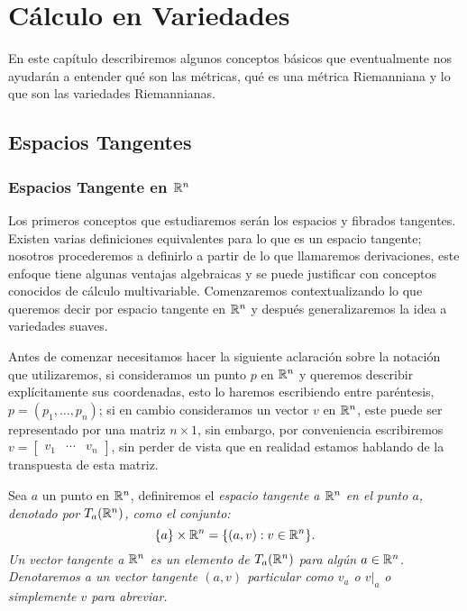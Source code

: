 \chapter{Cálculo en Variedades}\label{Capítulo: Cálculo en Variedades}
En este capítulo describiremos algunos conceptos básicos que eventualmente nos ayudarán a entender qué son las métricas, qué es una métrica Riemanniana y lo que son las variedades Riemannianas.

\section{Espacios Tangentes}
\subsection{Espacios Tangente en $\mathbb{R}^n$}


Los primeros conceptos que estudiaremos serán los espacios y fibrados tangentes. Existen varias definiciones equivalentes para lo que es un espacio tangente; nosotros procederemos a definirlo a partir de lo que llamaremos derivaciones, este enfoque tiene algunas ventajas algebraicas y se puede justificar con conceptos conocidos de cálculo multivariable. Comenzaremos contextualizando lo que queremos decir por espacio tangente en $\mathbb{R}^n$ y después generalizaremos la idea a variedades suaves.

Antes de comenzar necesitamos hacer la siguiente aclaración sobre la notación que utilizaremos, si consideramos un punto $p$ en $\mathbb{R}^n$ y queremos describir explícitamente sus coordenadas, esto lo haremos escribiendo entre paréntesis, $p = (p_1, \ldots, p_n)$; si en cambio consideramos un vector $v$ en $\mathbb{R}^n$, este puede ser representado por una matriz $n \times 1$, sin embargo, por conveniencia escribiremos $v = \begin{bmatrix} v_1 & \cdots & v_n \end{bmatrix}$, sin perder de vista que en realidad estamos hablando de la transpuesta de esta matriz.

\begin{definition}\label{Definición: Espacio Tangente en Rn}
	Sea $a$ un punto en $\mathbb{R}^n$, definiremos el \it{espacio tangente a $\mathbb{R}^n$ en el punto $a$}, denotado por $T_a(\mathbb{R}^n)$, como el conjunto:
	\[ \{a\} \times \mathbb{R}^n = \{(a,v): v \in \mathbb{R}^n\}. \]
	Un \it{vector tangente} a $\mathbb{R}^n$ es un elemento de $T_a(\mathbb{R}^n)$ para algún $a \in \mathbb{R}^n$. Denotaremos a un vector tangente $(a,v)$ particular como $v_a$ o $v|_a$ o simplemente $v$ para abreviar.
\end{definition}

